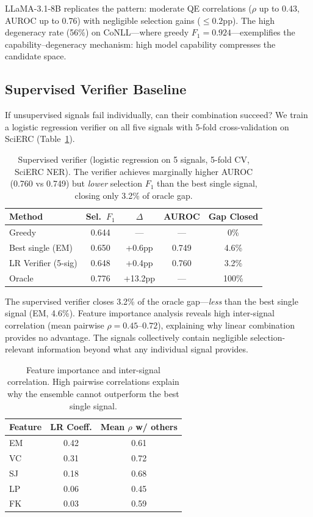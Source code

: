 \documentclass[11pt]{article}
\begin{document}
LLaMA-3.1-8B replicates the pattern: moderate QE correlations ($\rho$ up to 0.43, AUROC up to 0.76) with negligible selection gains ($\leq 0.2$pp). The high degeneracy rate (56\%) on CoNLL---where greedy $F_1 = 0.924$---exemplifies the capability--degeneracy mechanism: high model capability compresses the candidate space.

\subsection{Supervised Verifier Baseline}

If unsupervised signals fail individually, can their combination succeed? We train a logistic regression verifier on all five signals with 5-fold cross-validation on SciERC (Table~\ref{tab:verifier}).

\begin{table}[t]
\centering
\small
\begin{tabular}{lcccc}
\toprule
Method & Sel.\ $F_1$ & $\Delta$ & AUROC & Gap Closed \\
\midrule
Greedy & 0.644 & --- & --- & 0\% \\
Best single (EM) & 0.650 & +0.6pp & 0.749 & 4.6\% \\
LR Verifier (5-sig) & 0.648 & +0.4pp & 0.760 & 3.2\% \\
Oracle & 0.776 & +13.2pp & --- & 100\% \\
\bottomrule
\end{tabular}
\caption{Supervised verifier (logistic regression on 5 signals, 5-fold CV, SciERC NER). The verifier achieves marginally higher AUROC (0.760 vs 0.749) but \emph{lower} selection $F_1$ than the best single signal, closing only 3.2\% of oracle gap.}
\label{tab:verifier}
\end{table}

The supervised verifier closes 3.2\% of the oracle gap---\emph{less} than the best single signal (EM, 4.6\%). Feature importance analysis reveals high inter-signal correlation (mean pairwise $\rho = 0.45$--$0.72$), explaining why linear combination provides no advantage. The signals collectively contain negligible selection-relevant information beyond what any individual signal provides.

\begin{table}[t]
\centering
\small
\begin{tabular}{lcc}
\toprule
Feature & LR Coeff. & Mean $\rho$ w/ others \\
\midrule
EM & 0.42 & 0.61 \\
VC & 0.31 & 0.72 \\
SJ & 0.18 & 0.68 \\
LP & 0.06 & 0.45 \\
FK & 0.03 & 0.59 \\
\bottomrule
\end{tabular}
\caption{Feature importance and inter-signal correlation. High pairwise correlations explain why the ensemble cannot outperform the best single signal.}
\label{tab:feature_importance}
\end{table}
\end{document}

